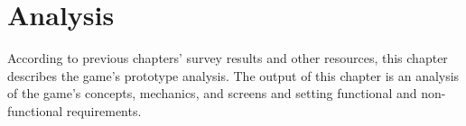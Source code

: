 \chapter{Analysis}
\label{analysis}

According to previous chapters' survey results and other resources, this chapter describes the game's prototype analysis.
The output of this chapter is an analysis of the game's concepts, mechanics, and screens and setting functional and non-functional requirements.




